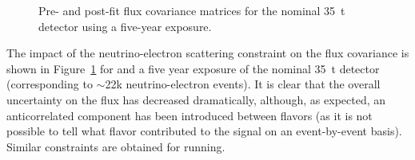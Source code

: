 \begin{figure}[htbp]
  \centering
  \caption{Pre- and post-fit  flux covariance matrices for the nominal \SI{35}{t}   detector using a five-year exposure.}
  \label{fig:LAR_nominal_covariances}
\end{figure}
The impact of the neutrino-electron scattering constraint on the flux covariance is shown in Figure~\ref{fig:LAR_nominal_covariances} for  and a five year exposure of the nominal \SI{35}{t}   detector (corresponding to $\sim$22k neutrino-electron events). It is clear that the overall uncertainty on the flux has decreased dramatically, although, as expected, an anticorrelated component has been introduced between flavors (as it is not possible to tell what flavor contributed to the signal on an event-by-event basis). Similar constraints are obtained for  running.

